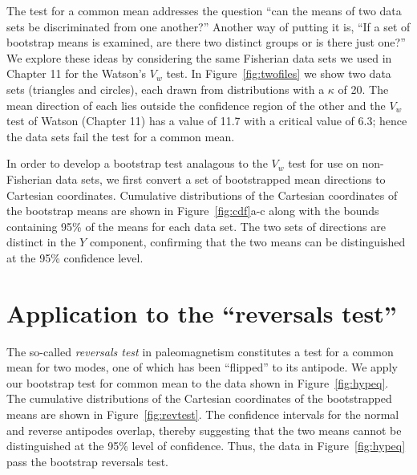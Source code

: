 The test for a common mean addresses the question ``can the means of two data
sets be discriminated from one another?''  
Another way of putting it is,  ``If a set of bootstrap means is examined, 
are there two distinct groups or is there
just one?''  We explore these ideas by considering  the same Fisherian data sets
we used in Chapter 11 for the Watson's $V_w$ test.  
In Figure~\ref{fig:twofiles} we show  two data sets (triangles and circles), 
each drawn from distributions with a $\kappa$ of 20.
The mean direction of each lies outside the confidence region of the other and the  $V_w$ test of 
 Watson (Chapter 11) has a value of 11.7 with a critical value of 6.3; hence the data sets  fail the test for a common mean. 

In order to develop a bootstrap test analagous to the $V_w$ test for use on non-Fisherian data sets, we first convert a set of bootstrapped mean  directions 
to Cartesian coordinates. Cumulative distributions of the Cartesian coordinates of the
bootstrap means  are shown in Figure~\ref{fig:cdf}a-c along with the bounds containing 95\% of the means for each data set.    The two sets of directions are distinct in the $Y$ component, confirming that the two means can  be distinguished at the 95\% confidence level.


\section {Application to the ``reversals test''}

The so-called 
{\it reversals test} in paleomagnetism constitutes a test
for a common mean for two modes, one of which has been ``flipped'' to
its antipode.  We apply our bootstrap test for common mean to the data shown
in Figure~\ref{fig:hypeq}.  The cumulative distributions of the Cartesian coordinates
of the bootstrapped means are shown in Figure~\ref{fig:revtest}.  The confidence intervals
for the normal and reverse antipodes overlap, thereby  suggesting  that the two
means cannot be distinguished at the 95\% level of confidence.  
 Thus,  the data in Figure~\ref{fig:hypeq} pass the bootstrap reversals test.  


